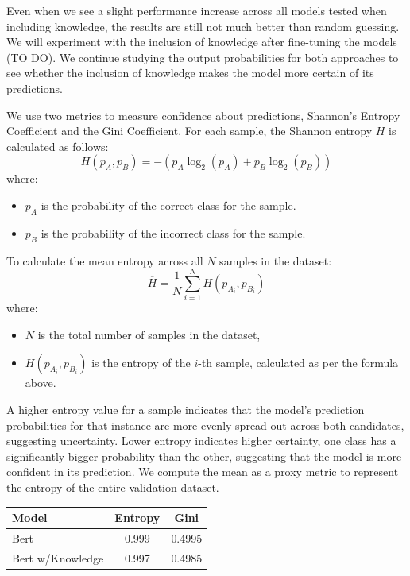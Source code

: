 \documentclass{article}
\begin{document}
\begin{multicols}{2}
Even when we see a slight performance increase across all models tested when including knowledge, the results are still not much better than random guessing. We will experiment with the inclusion of knowledge after fine-tuning the models (TO DO). We continue studying the output probabilities for both approaches to see whether the inclusion of knowledge makes the model more certain of its predictions. 


We use two metrics to measure confidence about predictions, Shannon's Entropy Coefficient and the Gini Coefficient. For each sample, the Shannon entropy \(H\) is calculated as follows:
\[
H(p_A, p_B) = -\left( p_A \log_2(p_A) + p_B \log_2(p_B) \right)
\]
where:
\begin{itemize}
    \item \(p_A\) is the probability of the correct class for the sample.
    \item \(p_B\) is the probability of the incorrect class for the sample.
\end{itemize}

To calculate the mean entropy across all \(N\) samples in the dataset:
\[
\overline{H} = \frac{1}{N} \sum_{i=1}^{N} H(p_{A_i}, p_{B_i})
\]
where:
\begin{itemize}
    \item \(N\) is the total number of samples in the dataset,
    \item \(H(p_{A_i}, p_{B_i})\) is the entropy of the \(i\)-th sample, calculated as per the formula above.
\end{itemize}

A higher entropy value for a sample indicates that the model's prediction probabilities for that instance are more evenly spread out across both candidates, suggesting uncertainty. Lower entropy indicates higher certainty, one class has a significantly bigger probability than the other, suggesting that the model is more confident in its prediction. We compute the mean as a proxy metric to represent the entropy of the entire validation dataset.

\vspace{0.2cm}
\begin{tabular}{lcc}
\toprule
Model & Entropy & Gini\\
\midrule
Bert  & 0.999 & 0.4995 \\
Bert w/Knowledge & 0.997 & 0.4985 \\
\bottomrule
\end{tabular}
\vspace{0.3cm}


\end{multicols}
\end{document}
